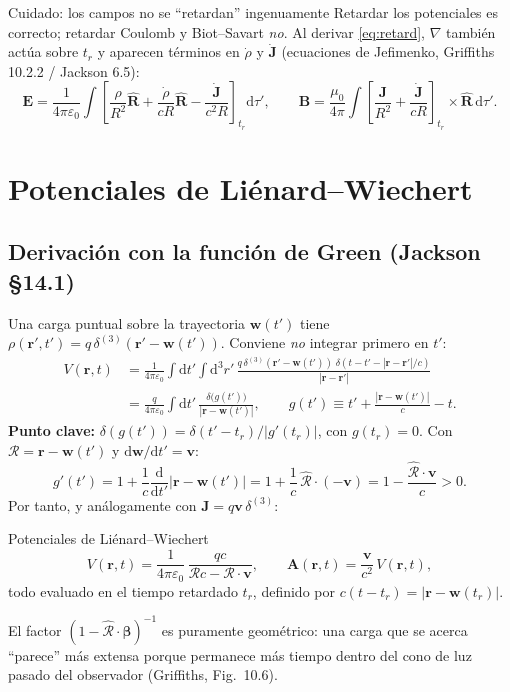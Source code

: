 \documentclass[11pt,a4paper]{article}
\newcommand{\Rv}{\bm{\mathcal R}}
\newcommand{\Rs}{\mathcal R}
\newcommand{\Rh}{\hat{\bm{\mathcal R}}}
\newcommand{\bv}{\mathbf v}
\newcommand{\rr}{\mathbf r}
\newcommand{\dd}{\mathrm d}
\newcommand{\bbeta}{\bm\beta}
\theoremstyle{remark}
\begin{document}
\begin{warnbox}{Cuidado: los campos no se ``retardan'' ingenuamente}
Retardar los potenciales es correcto; retardar Coulomb y Biot--Savart \emph{no}. Al derivar
\eqref{eq:retard}, $\nabla$ también actúa sobre $t_r$ y aparecen términos en $\dot\rho$ y $\dot{\mathbf J}$
(ecuaciones de Jefimenko, Griffiths 10.2.2 / Jackson 6.5):
\[
\mathbf E=\frac1{4\pi\varepsilon_0}\int\left[\frac{\rho}{R^2}\hat{\mathbf R}+\frac{\dot\rho}{cR}\hat{\mathbf R}-\frac{\dot{\mathbf J}}{c^2R}\right]_{t_r}\dd\tau',\qquad
\mathbf B=\frac{\mu_0}{4\pi}\int\left[\frac{\mathbf J}{R^2}+\frac{\dot{\mathbf J}}{cR}\right]_{t_r}\times\hat{\mathbf R}\,\dd\tau'.
\]
\end{warnbox}

\section{Potenciales de Liénard--Wiechert}

\subsection{Derivación con la función de Green (Jackson §14.1)}

Una carga puntual sobre la trayectoria $\mathbf w(t')$ tiene $\rho(\rr',t')=q\,\delta^{(3)}(\rr'-\mathbf w(t'))$.
Conviene \emph{no} integrar primero en $t'$:
\begin{align}
V(\rr,t)&=\frac1{4\pi\varepsilon_0}\int\dd t'\int\dd^3r'\,
\frac{q\,\delta^{(3)}(\rr'-\mathbf w(t'))\;\delta\!\left(t-t'-|\rr-\rr'|/c\right)}{|\rr-\rr'|}\nonumber\\
&=\frac{q}{4\pi\varepsilon_0}\int\dd t'\,\frac{\delta\big(g(t')\big)}{|\rr-\mathbf w(t')|},\qquad
g(t')\equiv t'+\frac{|\rr-\mathbf w(t')|}{c}-t.
\end{align}
\textbf{Punto clave:} $\delta(g(t'))=\delta(t'-t_r)/|g'(t_r)|$, con $g(t_r)=0$. Con
$\Rv=\rr-\mathbf w(t')$ y $\dd\mathbf w/\dd t'=\bv$:
\[
g'(t')=1+\frac1c\frac{\dd}{\dd t'}|\rr-\mathbf w(t')|=1+\frac1c\,\Rh\cdot(-\bv)=1-\frac{\Rh\cdot\bv}{c}>0.
\]
Por tanto, y análogamente con $\mathbf J=q\bv\,\delta^{(3)}$:
\begin{resbox}{Potenciales de Liénard--Wiechert}
\begin{equation}
V(\rr,t)=\frac1{4\pi\varepsilon_0}\,\frac{qc}{\Rs c-\Rv\cdot\bv},\qquad
\mathbf A(\rr,t)=\frac{\bv}{c^2}\,V(\rr,t),
\label{eq:LW}
\end{equation}
todo evaluado en el tiempo retardado $t_r$, definido por $c(t-t_r)=|\rr-\mathbf w(t_r)|$.
\end{resbox}
El factor $(1-\Rh\cdot\bbeta)^{-1}$ es puramente geométrico: una carga que se acerca ``parece'' más
extensa porque permanece más tiempo dentro del cono de luz pasado del observador (Griffiths, Fig.~10.6).
\end{document}
